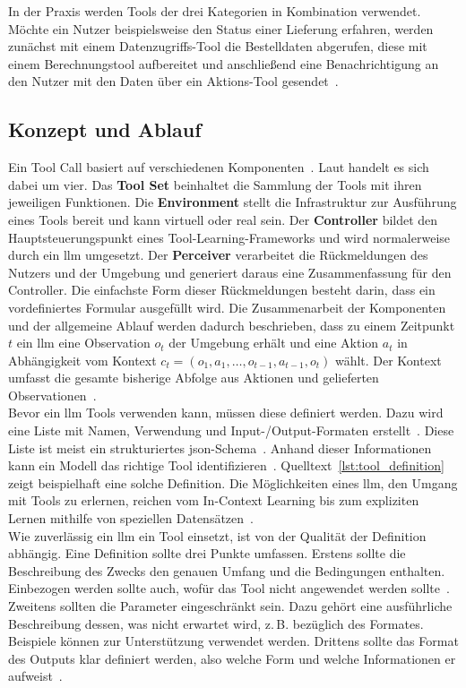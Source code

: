 In der Praxis werden Tools der drei Kategorien in Kombination verwendet. Möchte ein Nutzer beispielsweise den Status einer Lieferung erfahren, werden zunächst
mit einem Datenzugriffs-Tool die Bestelldaten abgerufen, diese mit einem Berechnungstool aufbereitet und anschließend eine Benachrichtigung an den Nutzer mit den 
Daten über ein Aktions-Tool gesendet~\cite{tc05}.

\subsection{Konzept und Ablauf}

Ein Tool Call basiert auf verschiedenen Komponenten~\cite{tc06}. Laut \textcite[10\psq]{tc11} handelt es sich dabei um vier. Das \textbf{Tool Set} beinhaltet die 
Sammlung der Tools mit ihren jeweiligen 
Funktionen. Die \textbf{Environment} stellt die Infrastruktur zur Ausführung eines Tools bereit und kann virtuell oder real sein. Der \textbf{Controller}
bildet den Hauptsteuerungspunkt
eines Tool-Learning-Frameworks und wird normalerweise durch ein \ac{llm} umgesetzt. Der \textbf{Perceiver} verarbeitet die Rückmeldungen des Nutzers und der Umgebung und 
generiert daraus
eine Zusammenfassung für den Controller. Die einfachste Form dieser Rückmeldungen besteht darin, dass ein vordefiniertes Formular ausgefüllt wird. Die Zusammenarbeit
der 
Komponenten und der allgemeine Ablauf werden dadurch beschrieben, dass zu einem Zeitpunkt $t$ ein \ac{llm} eine Observation $o_t$ der Umgebung erhält und eine Aktion
$a_t$ in Abhängigkeit vom Kontext $c_t = (o_1, a_1, \dots, o_{t-1}, a_{t-1}, o_t)$ wählt. Der Kontext umfasst die gesamte bisherige Abfolge aus Aktionen und 
gelieferten Observationen~\cite[3]{tc15}. \\
Bevor ein \ac{llm} Tools verwenden kann, müssen diese definiert werden. Dazu wird eine Liste mit Namen, Verwendung und Input-/Output-Formaten erstellt~\cite{tc03}. 
Diese Liste
ist meist ein strukturiertes \ac{json}-Schema~\cite{tc07}. Anhand dieser Informationen kann ein Modell das richtige Tool identifizieren~\cite{tc06}. 
Quelltext~\ref{lst:tool_definition}
zeigt beispielhaft eine solche Definition. Die Möglichkeiten eines \ac{llm}, den Umgang mit Tools zu erlernen, reichen vom In-Context Learning bis zum expliziten
Lernen mithilfe von speziellen Datensätzen~\cite[17777]{tc08}. \\
Wie zuverlässig ein \ac{llm} ein Tool einsetzt, ist von der Qualität der Definition abhängig. Eine Definition sollte drei Punkte umfassen. Erstens sollte die Beschreibung des Zwecks 
den genauen Umfang und die Bedingungen enthalten. Einbezogen werden sollte auch, wofür das Tool nicht angewendet werden sollte~\cite{tc03}. Zweitens sollten die 
Parameter
eingeschränkt sein. Dazu gehört eine ausführliche Beschreibung dessen, was nicht erwartet wird, z.\,B. bezüglich des Formates. Beispiele können zur Unterstützung verwendet 
werden. Drittens sollte das Format des Outputs klar definiert werden, also welche Form und welche Informationen er aufweist~\cite{tc03}.

